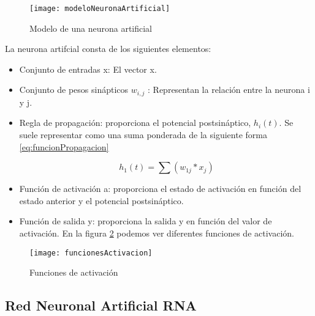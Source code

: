 \begin{figure}[h]
    \begin{center}%
        \begin{center}%
          \texttt{[image: modeloNeuronaArtificial]}%
          \caption{Modelo de una neurona artificial}%
          \label{figmodeloNeuronaArtificial}%
        \end{center}%
  	\end{center}%
\end{figure}%

\newpage
La neurona artifcial consta de los siguientes elementos:

\begin{itemize}
	\item{Conjunto de entradas x}: El vector x.
	\item{Conjunto de pesos sinápticos $w_{i,j}$ }: Representan la relación entre la neurona i y j.
	\item{Regla de propagación}: proporciona el potencial postsináptico, $h_i (t)$. Se suele representar como una suma ponderada de la siguiente forma \ref{eq:funcionPropagacion}
	
\begin{equation} \label{eq:funcionPropagacion}
	h_{1}(t)=\sum (w_{1j}*x_{j})
\end{equation}

	\item{Función de activación a}: proporciona el estado de activación en función del estado anterior y el potencial postsináptico.
	\item{Función de salida y}: proporciona la salida y en función del valor de activación. En la figura \ref{figfuncionesActivacion} podemos ver diferentes funciones de activación.
\end{itemize}

\begin{figure}[h]
    \begin{center}%
        \begin{center}%
          \texttt{[image: funcionesActivacion]}%
          \caption{Funciones de activación}%
          \label{figfuncionesActivacion}%
        \end{center}%
  	\end{center}%
\end{figure}%
\newpage

\subsection{Red Neuronal Artificial RNA}


